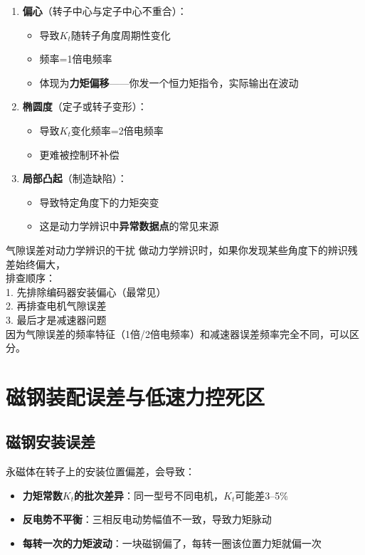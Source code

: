 \begin{enumerate}
  \item \textbf{偏心}（转子中心与定子中心不重合）：
  \begin{itemize}
    \item 导致$K_t$随转子角度周期性变化
    \item 频率=1倍电频率
    \item 体现为\textbf{力矩偏移}——你发一个恒力矩指令，实际输出在波动
  \end{itemize}
  \item \textbf{椭圆度}（定子或转子变形）：
  \begin{itemize}
    \item 导致$K_t$变化频率=2倍电频率
    \item 更难被控制环补偿
  \end{itemize}
  \item \textbf{局部凸起}（制造缺陷）：
  \begin{itemize}
    \item 导致特定角度下的力矩突变
    \item 这是动力学辨识中\textbf{异常数据点}的常见来源
  \end{itemize}
\end{enumerate}

\begin{cautionbox}{气隙误差对动力学辨识的干扰}
做动力学辨识时，如果你发现某些角度下的辨识残差始终偏大，\\
排查顺序：\\
1. 先排除编码器安装偏心（最常见）\\
2. 再排查电机气隙误差\\
3. 最后才是减速器问题\\
因为气隙误差的频率特征（1倍/2倍电频率）和减速器误差频率完全不同，可以区分。
\end{cautionbox}

\section{磁钢装配误差与低速力控死区}

\subsection{磁钢安装误差}

永磁体在转子上的安装位置偏差，会导致：

\begin{itemize}
  \item \textbf{力矩常数$K_t$的批次差异}：同一型号不同电机，$K_t$可能差3--5\%
  \item \textbf{反电势不平衡}：三相反电动势幅值不一致，导致力矩脉动
  \item \textbf{每转一次的力矩波动}：一块磁钢偏了，每转一圈该位置力矩就偏一次
\end{itemize}

